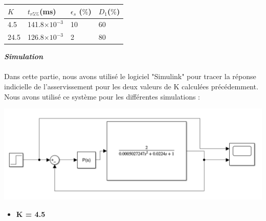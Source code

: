 \documentclass[12pt]{article}
\begin{document}
\begin{center}
    \begin{tabular}{ |p{3cm}|p{3cm}|p{3cm}|p{3cm}|}

        \hline
        $K$ & $t_{r5\%}$(ms) & $\epsilon_s$ ($\%$)&$D_1$($\%$)\\
        \hline
        4.5 & 141.8$\times 10^{-3}$ & 10 & 60\\
        24.5 & 126.8$\times10^{-3}$ & 2 & 80\\ 
        
        \hline
        \end{tabular}
    \end{center}
\large \textit{ \textbf{Simulation}}
\\\\\normalsize Dans cette partie, nous avons utilisé le logiciel "Simulink" pour tracer la réponse indicielle de
l’asservissement pour les deux valeurs de K calculées précédemment. Nous avons utilisé ce système
pour les différentes simulations : 
\begin{center}
    \includegraphics[width = 15 cm]{TP2 Simulink/Syst_2/Syst_2_Simunlink_P.png}
\end{center}
\begin{itemize}
    \item \bf \large K = 4.5
\end{itemize}
\end{document}
